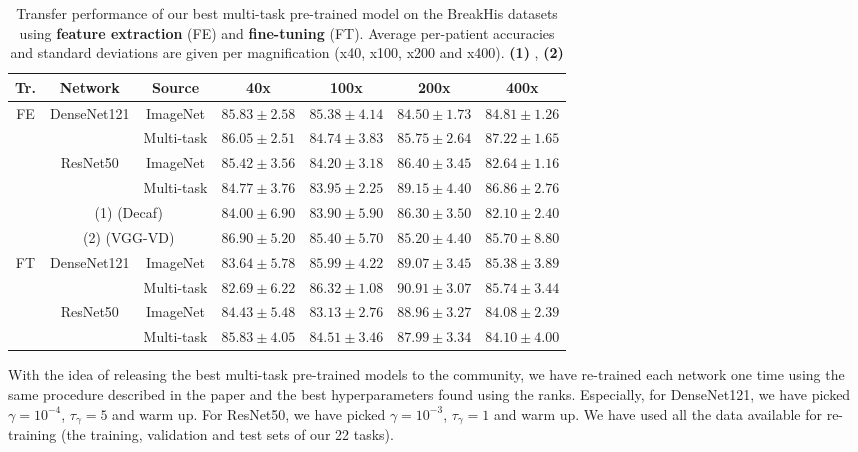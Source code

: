 \begin{table}
    \centering
    \small
    \begin{tabular}{|c|c|c|cccc|}
        \hline
        Tr. & Network & Source & 40x & 100x & 200x & 400x \\
        \hline
\multirow{6}{*}{FE} & \multirow{2}{*}{DenseNet121} & ImageNet & $85.83 \pm 2.58$ & $85.38 \pm 4.14$ & $84.50 \pm 1.73$ & $84.81 \pm 1.26$\\
& & Multi-task & $86.05 \pm 2.51$ & $84.74 \pm 3.83$ & $85.75 \pm 2.64$ & $87.22 \pm 1.65$\\
\cline{2-7}
& \multirow{2}{*}{ResNet50} & ImageNet & $85.42 \pm 3.56$ & $84.20 \pm 3.18$ & $86.40 \pm 3.45$ & $82.64 \pm 1.16$\\
& & Multi-task & $84.77 \pm 3.76$ & $83.95 \pm 2.25$ & $89.15 \pm 4.40$ & $86.86 \pm 2.76$\\
\cline{2-7}
&  \multicolumn{2}{c|}{(1) (Decaf)} &  $84.00 \pm 6.90 $ & $83.90  \pm 5.90$ & $86.30 \pm 3.50$ & $82.10 \pm 2.40$ \\
& \multicolumn{2}{c|}{(2) (VGG-VD)} & $86.90 \pm 5.20$ & $85.40 \pm 5.70$ & $85.20 \pm 4.40$ & $85.70 \pm 8.80$ \\
\hline
\multirow{4}{*}{FT} & \multirow{2}{*}{DenseNet121} & ImageNet & $83.64 \pm 5.78$ & $85.99 \pm 4.22$ & $89.07 \pm 3.45$ & $85.38 \pm 3.89$\\
& & Multi-task & $82.69 \pm 6.22$ & $86.32 \pm 1.08$ & $90.91 \pm 3.07$ & $85.74 \pm 3.44$\\
\cline{2-7}
& \multirow{2}{*}{ResNet50} & ImageNet & $84.43 \pm 5.48$ & $83.13 \pm 2.76$ & $88.96 \pm 3.27$ & $84.08 \pm 2.39$\\
& & Multi-task & $85.83 \pm 4.05$ & $84.51 \pm 3.46$ & $87.99 \pm 3.34$ & $84.10 \pm 4.00$\\
        \hline
    \end{tabular}
    \caption{Transfer performance of our best multi-task pre-trained model on the BreakHis datasets using \textbf{feature extraction} (FE) and \textbf{fine-tuning} (FT). Average per-patient accuracies and standard deviations are given per magnification (x40, x100, x200 and x400). \textbf{(1)} \cite{spanhol2017deep}, \textbf{(2)} \cite{song2017supervised}}
    \label{tab:mtask:breakhis_eval}
\end{table}

With the idea of releasing the best multi-task pre-trained models to the community, we have re-trained each network one time using the same procedure described in the paper and the best hyperparameters found using the ranks. Especially, for DenseNet121, we have picked $\gamma = 10^{-4}$, $\tau_\gamma = 5$ and warm up. For ResNet50, we have picked $\gamma = 10^{-3}$, $\tau_\gamma = 1$ and warm up. We have used all the data available for re-training (\ie the training, validation and test sets of our 22 tasks).


